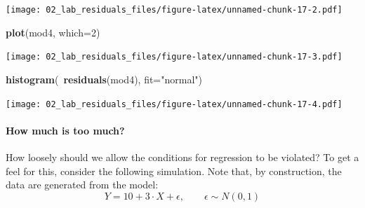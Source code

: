 \documentclass[]{article}
\newenvironment{Shaded}{\begin{snugshade}}{\end{snugshade}}
\newcommand{\KeywordTok}[1]{\textcolor[rgb]{0.13,0.29,0.53}{\textbf{{#1}}}}
\newcommand{\DataTypeTok}[1]{\textcolor[rgb]{0.13,0.29,0.53}{{#1}}}
\newcommand{\DecValTok}[1]{\textcolor[rgb]{0.00,0.00,0.81}{{#1}}}
\newcommand{\StringTok}[1]{\textcolor[rgb]{0.31,0.60,0.02}{{#1}}}
\newcommand{\NormalTok}[1]{{#1}}
\let\oldparagraph\paragraph
\renewcommand{\paragraph}[1]{\oldparagraph{#1}\mbox{}}
\begin{document}
\texttt{[image: 02\_lab\_residuals\_files/figure-latex/unnamed-chunk-17-2.pdf]}

\begin{Shaded}
\begin{Highlighting}[]
\KeywordTok{plot}\NormalTok{(mod4, }\DataTypeTok{which=}\DecValTok{2}\NormalTok{)}
\end{Highlighting}
\end{Shaded}

\texttt{[image: 02\_lab\_residuals\_files/figure-latex/unnamed-chunk-17-3.pdf]}

\begin{Shaded}
\begin{Highlighting}[]
\KeywordTok{histogram}\NormalTok{(~}\KeywordTok{residuals}\NormalTok{(mod4), }\DataTypeTok{fit=}\StringTok{"normal"}\NormalTok{)}
\end{Highlighting}
\end{Shaded}

\texttt{[image: 02\_lab\_residuals\_files/figure-latex/unnamed-chunk-17-4.pdf]}

\paragraph{How much is too much?}\label{how-much-is-too-much}

How loosely should we allow the conditions for regression to be
violated? To get a feel for this, consider the following simulation.
Note that, by construction, the data are generated from the model: \[
  Y = 10 + 3 \cdot X + \epsilon, \qquad \epsilon \sim N(0, 1)
\]

\begin{Shaded}
\end{Shaded}
\end{document}
